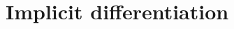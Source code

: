 \documentclass[../book/calcnotes.tex]{subfiles}
\begin{document}
\section{Implicit differentiation}
\label{sec:derivs.implicit}

\begin{exercises}
\end{exercises}
\end{document}
